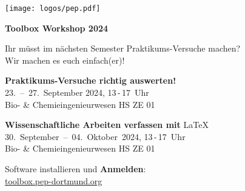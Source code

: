 \documentclass[paper=landscape]{scrartcl}
\begin{document}
  \begin{minipage}{0.25\textwidth}%
    \texttt{[image: logos/pep.pdf]}%
  \end{minipage}%
  \begin{minipage}{0.75\textwidth}%
    \centering\fontsize{50}{60}\bfseries\selectfont Toolbox Workshop 2024%
  \end{minipage}%

  \vspace{0.5cm}

  \begin{center}
    \Huge Ihr müsst im nächsten Semester Praktikums-Versuche machen? \\[0.5\baselineskip]
    Wir machen es euch einfach(er)!
  \end{center}

  \vspace{0.1cm}

  \begin{center}
    \huge \textbf{Praktikums-Versuche richtig auswerten!} \\[0.5\baselineskip]
    23.~–~27.~September 2024, 13\,-\,17~Uhr \\
    Bio- \& Chemieingenieurwesen HS ZE 01 %
  \end{center}
  \vspace{0.1cm}
  \begin{center}
    \huge \textbf{Wissenschaftliche Arbeiten verfassen mit} \textrm{\LaTeX}\\[0.5\baselineskip]
    30.~September~–~04.~Oktober~2024, 13\,-\,17~Uhr \\
    Bio- \& Chemieingenieurwesen HS ZE 01 %
  \end{center}
  \vspace{0.1cm}
  \begin{center}
    \large Software installieren und \textbf{Anmelden}: \\
    \Huge \href{https://toolbox.pep-dortmund.org}{toolbox.pep-dortmund.org}
  \end{center}
\end{document}
